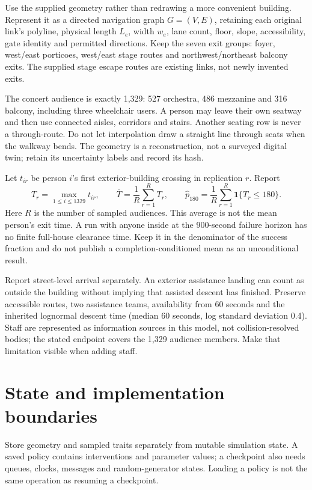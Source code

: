 \documentclass[11pt,a4paper]{article}
\newcommand{\ind}{\mathbf{1}}
\begin{document}
Use the supplied geometry rather than redrawing a more convenient building. Represent it as a directed navigation graph $G=(V,E)$, retaining each original link's polyline, physical length $L_e$, width $w_e$, lane count, floor, slope, accessibility, gate identity and permitted directions. Keep the seven exit groups: foyer, west/east porticoes, west/east stage routes and northwest/northeast balcony exits. The supplied stage escape routes are existing links, not newly invented exits.

The concert audience is exactly 1,329: 527 orchestra, 486 mezzanine and 316 balcony, including three wheelchair users. A person may leave their own seatway and then use connected aisles, corridors and stairs. Another seating row is never a through-route. Do not let interpolation draw a straight line through seats when the walkway bends. The geometry is a reconstruction, not a surveyed digital twin; retain its uncertainty labels and record its hash.

Let $t_{ir}$ be person $i$'s first exterior-building crossing in replication $r$. Report
\begin{equation}\label{impl:eq1}
 T_r=\max_{1\leq i\leq1329}t_{ir},\qquad
 \overline T=\frac1R\sum_{r=1}^{R}T_r,\qquad
 \widehat p_{180}=\frac1R\sum_{r=1}^{R}\ind\{T_r\leq180\}.
\end{equation}
Here $R$ is the number of sampled audiences. This average is not the mean person's exit time. A run with anyone inside at the 900-second failure horizon has no finite full-house clearance time. Keep it in the denominator of the success fraction and do not publish a completion-conditioned mean as an unconditional result.

Report street-level arrival separately. An exterior assistance landing can count as outside the building without implying that assisted descent has finished. Preserve accessible routes, two assistance teams, availability from 60 seconds and the inherited lognormal descent time (median 60 seconds, log standard deviation 0.4). Staff are represented as information sources in this model, not collision-resolved bodies; the stated endpoint covers the 1,329 audience members. Make that limitation visible when adding staff.

\section{State and implementation boundaries}

Store geometry and sampled traits separately from mutable simulation state. A saved policy contains interventions and parameter values; a checkpoint also needs queues, clocks, messages and random-generator states. Loading a policy is not the same operation as resuming a checkpoint.
\end{document}
